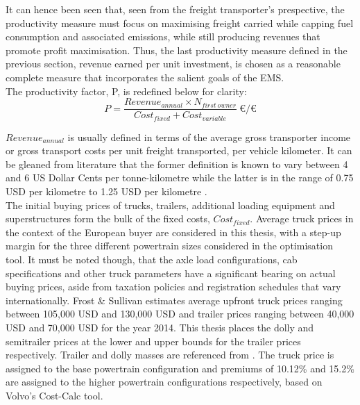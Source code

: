 \documentclass[ExampleMasters.tex]{subfiles}
\begin{document}
		It can hence been seen that, seen from the freight transporter's prespective, the productivity measure must focus on maximising freight carried while capping fuel consumption and associated emissions, while still producing revenues that promote profit maximisation. Thus, the last productivity measure defined in the previous section, revenue earned per unit investment, is chosen as a reasonable complete measure that incorporates the salient goals of the EMS.\\ 

		The productivity factor, P, is redefined below for clarity:
		\begin{equation} \label{eq:productivity}
			P = \frac{Revenue_{annual} \times N_{first\ owner}}{Cost_{fixed} + Cost_{variable}}\ \euro/\euro
		\end{equation}

		$Revenue_{annual}$ is usually defined in terms of the average gross transporter income or gross transport costs per unit freight transported, per vehicle kilometer. It can be gleaned from literature that the former definition is known to vary between 4 and 6 US Dollar Cents per tonne-kilometre \cite{WorldBankReport} while the latter is in the range of 0.75 USD per kilometre to 1.25 USD per kilometre \cite{WorldBankReport}.\\

		The initial buying prices of trucks, trailers, additional loading equipment and superstructures form the bulk of the fixed costs, $Cost_{fixed}$. Average truck prices in the context of the European buyer are considered in this thesis, with a step-up margin for the three different powertrain sizes considered in the optimisation tool. It must be noted though, that the axle load configurations, cab specifications and other truck parameters have a significant bearing on actual buying prices, aside from taxation policies and registration schedules that vary internationally. Frost \& Sullivan \cite{FrostSullivan} estimates average upfront truck prices ranging between 105,000 USD and 130,000 USD and trailer prices ranging between 40,000 USD and 70,000 USD for the year 2014. This thesis places the dolly and semitrailer prices at the lower and upper bounds for the trailer prices respectively. Trailer and dolly masses are referenced from \cite{VehCombAurell}. The truck price is assigned to the base powertrain configuration and premiums of 10.12\% and 15.2\% are assigned to the higher powertrain configurations respectively, based on Volvo's Cost-Calc tool.\\
\end{document}
